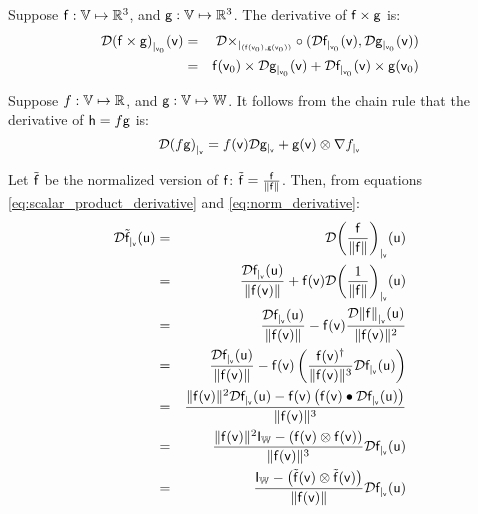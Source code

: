 Suppose
$\f:\Space{V} \mapsto \Reals^3$, and
$\g:\Space{V} \mapsto \Reals^3$.
The derivative of $\f \times \g$ is:
\begin{eqnarray}
\Dc{(\f \times \g)}{\v_0}{\v}
& =
& \Db{\times}{(\f(\v_0),\g(\v_0))} \circ (\Dc{\f}{\v_0}{\v}, \Dc{\g}{\v_0}{\v})
\\
& =
& \f(\v_0) \times \Dc{\g}{\v_0}{\v} + \Dc{\f}{\v_0}{\v} \times \g(\v_0) \nonumber
\end{eqnarray}

\label{sec:Scalar-products}

Suppose
$f:\Space{V} \mapsto \Reals$, and
$\g:\Space{V} \mapsto \Space{W}$.
It follows from the chain rule that the derivative of $\h = f\g$ is:
\begin{equation}
\label{eq:scalar_product_derivative}
\Db{(f\g)}{\v} =  f(\v) \Db{\g}{\v} + \g(\v) \otimes \Gb{f}{\v}
\end{equation}

\label{sec:Normalized-functions}

Let $\tilde{\f}$ be the normalized version of $\f$:
$\tilde{\f}  =  \frac{\f}{\| \f \|}$.
Then, from equations \ref{eq:scalar_product_derivative}
and \ref{eq:norm_derivative}:
\begin{eqnarray}
\Dc{\tilde{\f}}{\v}{\u}
& = &
\Dc{\left( \frac{\f}{\| \f \|}\right)}{\v}{\u}
\\
& = &
\frac{\Dc{\f}{\v}{\u}}{ \| \f(\v) \|}
 +
\f(\v)  \Dc{ \left( \frac{1}{\| \f \|} \right) }{\v}{\u} \nonumber \\
& = &
\frac{\Dc{\f}{\v}{\u}}
{\| \f(\v) \|}
 -
\f(\v)
\frac{\Dc{\| \f \|}{\v}{\u}}
{\|\f(\v)\|^2} \nonumber \\
& = &
\frac{\Dc{\f}{\v}{\u}}{ \| \f(\v) \| }
 -
\f(\v) \left( \frac{\f(\v)^\dagger}{\| \f(\v) \|^3}  \Dc{\f}{\v}{\u} \right) \nonumber \\
& = &
\frac{
\| \f(\v) \|^2 \Dc{\f}{\v}{\u}
 -
\f(\v)\left( \f(\v) \bullet \Dc{\f}{\v}{\u} \right)
}
{\| \f(\v) \|^3}  \nonumber \\
& = &
\frac{\| \f(\v) \|^2 \Identity_{\Space{W}} - \left( \f(\v) \otimes \f(\v) \right)  }
{ \| \f(\v) \|^3 }
\Dc{\f}{\v}{\u} \nonumber \\
& = &
\frac{\Identity_{\Space{W}} - \left( \tilde{\f}(\v) \otimes \tilde{\f}(\v) \right)  }
{\| \f(\v) \|}
\Dc{\f}{\v}{\u} \nonumber
\end{eqnarray}


